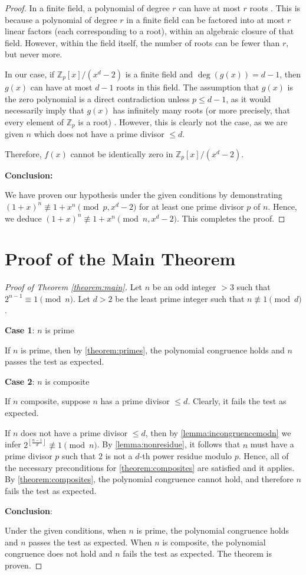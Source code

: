 \documentclass{article}
\theoremstyle{plain}
\theoremstyle{definition}
\newcommand{\floor}[1]{\left\lfloor #1 \right\rfloor}
\begin{document}
\begin{proof}
In a finite field, a polynomial of degree $r$ can have at most $r$ roots \cite{dummit2004abstractalgebra}. This is because a polynomial of degree $r$ in a finite field can be factored into at most $r$ linear factors (each corresponding to a root), within an algebraic closure of that field. However, within the field itself, the number of roots can be fewer than $r$, but never more.

In our case, if $\mathbb{Z}_p[x]/(x^d - 2)$ is a finite field and $\deg(g(x)) = d-1$, then $g(x)$ can have at most $d-1$ roots in this field. The assumption that $g(x)$ is the zero polynomial is a direct contradiction unless $p \leq d-1$, as it would necessarily imply that $g(x)$ has infinitely many roots (or more precisely, that every element of $\mathbb{Z}_p$ is a root) \cite{koppartywang2014roots}. However, this is clearly not the case, as we are given $n$ which does not have a prime divisor $\leq d$.

Therefore, $f(x)$ cannot be identically zero in $\mathbb{Z}_p[x]/(x^d - 2)$.

\textbf{Conclusion:}

We have proven our hypothesis under the given conditions by demonstrating $(1 + x)^n \not\equiv 1 + x^n \pmod{p, x^d-2}$ for at least one prime divisor $p$ of $n$. Hence, we deduce $(1 + x)^n \not\equiv 1 + x^n \pmod{n, x^d-2}$. This completes the proof.
\end{proof}

\section{Proof of the Main Theorem}
\begin{proof}[Proof of Theorem \ref{theorem:main}]
Let $n$ be an odd integer $>3$ such that $2^{n-1} \equiv 1 \pmod{n}$. Let $d > 2$ be the least prime integer such that $n \not\equiv 1 \pmod{d}$.

\textbf{Case 1}: $n$ is prime

If $n$ is prime, then by \cref{theorem:primes}, the polynomial congruence holds and $n$ passes the test as expected.

\textbf{Case 2}: $n$ is composite

If $n$ composite, suppose $n$ has a prime divisor $\leq d$. Clearly, it fails the test as expected.

If $n$ does not have a prime divisor $\leq d$, then by \cref{lemma:incongruencemodn} we infer $2^{\floor{\frac{n-1}{d}}} \not\equiv 1 \pmod{n}$. By \cref{lemma:nonresidue}, it follows that $n$ must have a prime divisor $p$ such that $2$ is not a $d$-th power residue modulo $p$. Hence, all of the necessary preconditions for \cref{theorem:composites} are satisfied and it applies. By \cref{theorem:composites}, the polynomial congruence cannot hold, and therefore $n$ fails the test as expected.

\textbf{Conclusion}:

Under the given conditions, when $n$ is prime, the polynomial congruence holds and $n$ passes the test as expected. When $n$ is composite, the polynomial congruence does not hold and $n$ fails the test as expected. The theorem is proven.
\end{proof}
\end{document}
